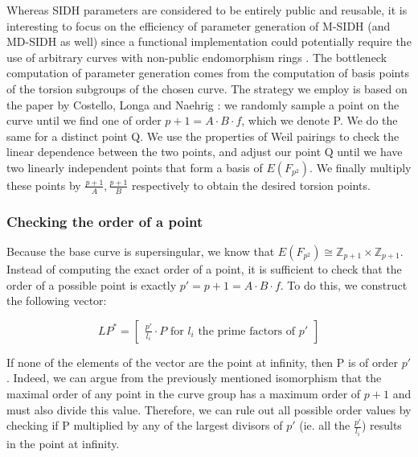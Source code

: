 \documentclass[a4paper,11pt,oneside]{report}
\begin{document}
    Whereas SIDH parameters are considered to be entirely public and reusable, it is interesting to focus on the efficiency of parameter generation of M-SIDH (and MD-SIDH as well) since a functional implementation could potentially require the use of arbitrary curves with non-public endomorphism rings \cite{msidh}. The bottleneck computation of parameter generation comes from the computation of basis points of the torsion subgroups of the chosen curve. The strategy we employ is based on the paper by Costello, Longa and Naehrig \cite{algorithms}: we randomly sample a point on the curve until we find one of order $p+1 = A\cdot B \cdot f$, which we denote P. We do the same for a distinct point Q. We use the properties of Weil pairings to check the linear dependence between the two points, and adjust our point Q until we have two linearly independent points that form a basis of $E(F_{ p^{2}})$. We finally multiply these points by $\frac{p+1}{A}, \frac{p+1}{B}$ respectively to obtain the desired torsion points.

        \subsubsection{Checking the order of a point}
    
        Because the base curve is supersingular, we know that $E(F_{ p^{2}}) \cong \mathbb{Z}_{p+1} \times \mathbb{Z}_{p+1}$. Instead of computing the exact order of a point, it is sufficient to check that the order of a possible point is exactly $p' = p+1 = A \cdot B \cdot f$. To do this, we construct the following vector:
    
         \begin{displaymath}
         \label{eq:lp_star}
             LP^* = \begin{bmatrix}\frac{p'}{l_i} \cdot P \textrm{  for } l_i \textrm{ the prime factors of } p'\end{bmatrix} 
         \end{displaymath}
    
        If none of the elements of the vector are the point at infinity, then P is of order $p'$. Indeed, we can argue from the previously mentioned isomorphism that the maximal order of any point in the curve group has a maximum order of $p+1$ and must also divide this value. Therefore, we can rule out all possible order values by checking if P multiplied by any of the largest divisors of $p'$ (ie. all the $\frac{p'}{l_i}$) results in the point at infinity. 
\end{document}
